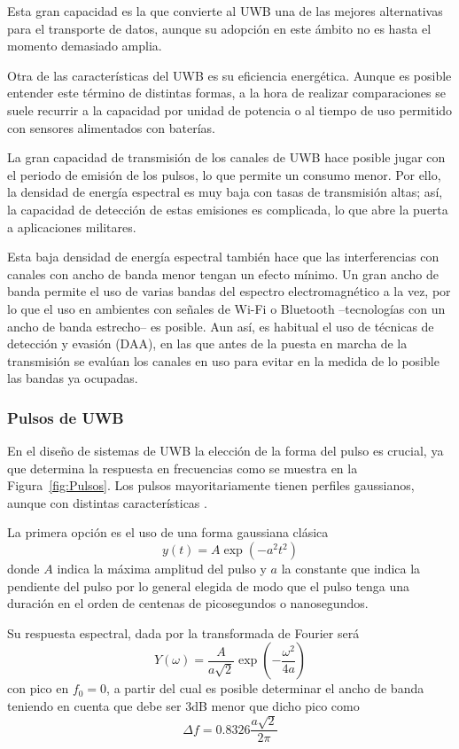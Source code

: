 Esta gran capacidad es la que convierte al UWB una de las mejores alternativas para el transporte de datos, aunque su adopción en este ámbito no es hasta el momento demasiado amplia.

Otra de las características del UWB es su eficiencia energética.
Aunque es posible entender este término de distintas formas, a la hora de realizar comparaciones se suele recurrir a la capacidad por unidad de potencia o al tiempo de uso permitido con sensores alimentados con baterías.

La gran capacidad de transmisión de los canales de UWB hace posible jugar con el periodo de emisión de los pulsos, lo que permite un consumo menor.
Por ello, la densidad de energía espectral es muy baja con tasas de transmisión altas; así, la capacidad de detección de estas emisiones es complicada, lo que abre la puerta a aplicaciones militares.

Esta baja densidad de energía espectral también hace que las interferencias con canales con ancho de banda menor tengan un efecto mínimo.
Un gran ancho de banda permite el uso de varias bandas del espectro electromagnético a la vez, por lo que el uso en ambientes con señales de Wi-Fi o Bluetooth --tecnologías con un ancho de banda estrecho-- es posible.
Aun así, es habitual el uso de técnicas de detección y evasión (DAA), en las que antes de la puesta en marcha de la transmisión se evalúan los canales en uso para evitar en la medida de lo posible las bandas ya ocupadas.

\subsubsection{Pulsos de UWB}
En el diseño de sistemas de UWB la elección de la forma del pulso es crucial, ya que determina la respuesta en frecuencias como se muestra en la Figura~\ref{fig:Pulsos}.
Los pulsos mayoritariamente tienen perfiles gaussianos, aunque con distintas características \cite{Du}.

La primera opción es el uso de una forma gaussiana clásica
\begin{equation}\label{eq:pulso_gauss}
    y(t) = A\exp(-a^2 t^2)
\end{equation}
donde $A$ indica la máxima amplitud del pulso y $a$ la constante que indica la pendiente del pulso por lo general elegida de modo que el pulso tenga una duración en el orden de centenas de picosegundos o nanosegundos.

Su respuesta espectral, dada por la transformada de Fourier será    
\begin{equation}
    Y(\omega) = \frac{A}{a\sqrt{2}}\exp(-\frac{\omega^2}{4a})
\end{equation}
con pico en $f_0=0$, a partir del cual es posible determinar el ancho de banda teniendo en cuenta que debe ser 3dB menor que dicho pico como
\begin{equation}
    \Delta f = 0.8326\frac{a\sqrt{2}}{2\pi}
\end{equation}

